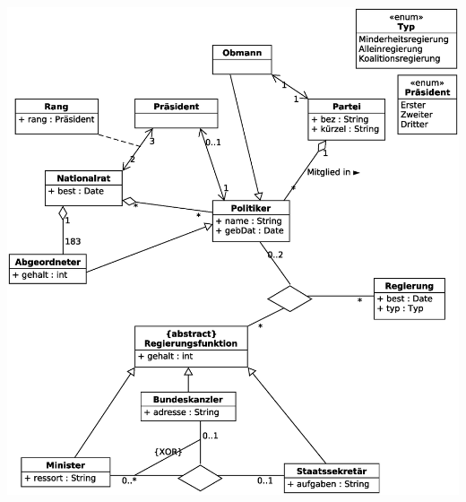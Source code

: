 \documentclass[a4paper, 12pt, margins=2cm]{homework}
\begin{document}
  \begin{solution}\hfill
    \begin{center}
      \includegraphics[scale=0.6]{Aufgabe5u6.eps}
    \end{center}
  \end{solution}
\end{document}
